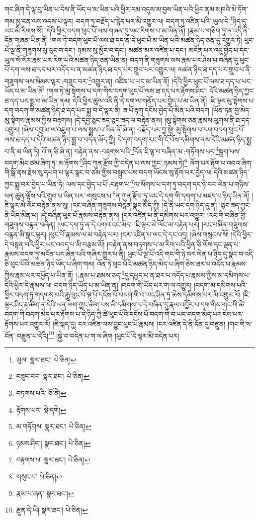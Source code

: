 གང་ཞིག་དེ་ལྟ་བུ་ཡིན་པ་དེས་ནི་ཡོད་པ་མ་ཡིན་པའི་ཕྱིར་རམ་འདུས་མ་བྱས་ཡིན་པའི་ཕྱིར་ནམ་མཁའི་མེ་ཏོག་གམ་མྱ་ངན་ལས་འདས་པ་ལྟར། བདག་ཏུ་བརྗོད་པ་རྙེད་པར་མི་འགྱུར་ལ། བདག་ཏུ་འཛིན་པའི་:ཡུལ་དེ་\footnote{ཡུལ་  སྣར་ཐང་།  པེ་ཅིན། }ཉིད་དུ་ཡང་མི་རིགས་སོ། །དེའི་ཕྱིར་བདག་ཕུང་པོ་ལས་གཞན་དུ་ཡང་རིགས་པ་མ་ཡིན་ནོ། །རྣམ་པ་གཅིག་ཏུ་ན་འདི་ནི་དོན་གཞན་ཡིན་ནོ། །གལ་ཏེ་བདག་ཕུང་པོ་ལས་ཐ་དད་ན་དེ་ཕུང་པོ་མ་ཡིན་པའི་མཚན་ཉིད་ཅན་དུ་འགྱུར་ཏེ། ཕུང་པོ་ལྔ་ནི་གཟུགས་སུ་རུང་བ་དང་། ཉམས་སུ་མྱོང་བ་དང་། མཚན་མར་འཛིན་པ་དང་། མངོན་པར་འདུ་བྱེད་པ་དང་ཡུལ་སོ་སོར་རྣམ་པར་རིག་པའི་མཚན་ཉིད་ཅན་ཡིན་ན། བདག་ནི་གཟུགས་ལས་རྣམ་པར་ཤེས་པ་བཞིན་དུ་ཕུང་པོ་དག་ལས་ཐ་དད་པར་འདོད་པ་ན་མཚན་ཉིད་ཐ་དད་པར་གྲུབ་པར་འགྱུར་ལ། མཚན་ཉིད་ཐ་དད་པར་གྲུབ་པ་ནི་གཟུགས་ལས་སེམས་ལྟར་:གཟུང་བར་\footnote{བཟུང་བར་  སྣར་ཐང་།  པེ་ཅིན། }འགྱུར་ན། འཛིན་པ་ཡང་མ་ཡིན་ནོ། །དེའི་ཕྱིར་ཕུང་པོ་ལས་ཐ་དད་པ་ཡང་ཡོད་པ་མ་ཡིན་ནོ། །གལ་ཏེ་མུ་སྟེགས་པ་དག་གིས་བདག་ཕུང་པོ་ལས་ཐ་དད་པར་རྟོགས་ཤིང་། དེའི་མཚན་ཉིད་ཀྱང་ཐ་དད་པར་སྨྲ་བ་མ་ཡིན་ནམ། དེའི་ཕྱིར་ཚུལ་འདི་ནི་དེ་དག་ལ་གནོད་པར་བྱེད་པ་མ་ཡིན་ནོ། །ཇི་ལྟར་མུ་སྟེགས་པ་དག་བདག་གི་མཚན་ཉིད་ཐ་དད་པར་སྨྲ་བ་དེ་ལྟར་ནི། ཟ་པོ་རྟག་དངོས་བྱེད་པོ་མིན་པའི་བདག །ཡོན་ཏན་བྱ་མེད་མུ་སྟེགས་རྣམས་ཀྱིས་བརྟགས། །དེ་དབྱེ་ཅུང་ཟད་ཅུང་ཟད་ལ་བརྟེན་ནས། །མུ་སྟེགས་ཅན་རྣམས་ལུགས་ནི་ཐ་དད་འགྱུར། །ཞེས་དབུ་མ་ལ་འཇུག་པ་ལས་སྨྲས་པ་ཡིན་ནོ་ཞེ་ན། བརྗོད་པར་བྱ་སྟེ། མུ་སྟེགས་པ་དག་བདག་ཕུང་པོ་ལས་ཐ་དད་པ་དེའི་མཚན་ཉིད་སྨྲ་བ་བདེན་མོད་ཀྱི། དེ་དག་བདག་རང་གི་ངོ་བོས་དམིགས་ནས་དེའི་མཚན་ཉིད་སྨྲ་བ་ནི་མ་ཡིན་ཏེ། འོ་ན་ཅི་ཞེ་ན། བརྟེན་ནས་:བརྟགས་པའི་\footnote{བཏགས་པའི་  ཅོ་ནེ། }དོན་ཇི་ལྟ་བ་བཞིན་མ་:གཏོགས་པར་\footnote{རྟོགས་པར་  སྡེ་དགེ། }སྐྲག་པས་བདག་མིང་ཙམ་ཞིག་ཏུ་:མ་རྟོགས་\footnote{མ་གཏོགས་  སྣར་ཐང་།  པེ་ཅིན། }ཤིང་ཀུན་རྫོབ་ཀྱི་བདེན་པ་ལས་ཀྱང་:ཉམས་ཏེ།\footnote{ཉམས་ཤིང་།  སྣར་ཐང་།  པེ་ཅིན། } ལོག་པར་རྟོག་པ་འབའ་ཞིག་གི་སྒོ་ནས་རྗེས་སུ་དཔག་པ་ལྟར་སྣང་བ་ཙམ་གྱིས་བསླུས་པས་བདག་ཡོངས་སུ་རྟོག་པར་བྱེད་ལ། དེའི་མཚན་ཉིད་ཀྱང་སྨྲ་བར་བྱེད་པ་ཡིན་ཏེ། ལས་དང་བྱེད་པ་པོ་:བརྟག་པ་\footnote{བརྟགས་པ་  སྣར་ཐང་།  པེ་ཅིན། }ལ་སོགས་པ་དག་ཏུ་བདག་དང་ཉེ་བར་ལེན་པ་གཉིས་ཕན་ཚུན་ལྟོས་པའི་གྲུབ་པ་ཡིན་པར་:གསུངས་པ་\footnote{གསུང་བ་  པེ་ཅིན། }ན་ཀུན་རྫོབ་ཏུ་ཡང་དེ་དག་གི་དགག་པ་མཛད་པ་ཉིད་ཡིན་ནོ། །ཇི་ལྟར་མེ་ལོང་བརྟེན་ནས་སུ། །རང་བཞིན་གཟུགས་བརྙན་སྣང་མོད་ཀྱི། །དེ་ནི་ཡང་དག་ཉིད་དུ་ན། །ཅུང་ཟད་ཀྱང་ནི་ཡོད་མིན་པ། །དེ་བཞིན་ཕུང་པོ་རྣམས་བརྟེན་ནས། །ངར་འཛིན་པ་ནི་དམིགས་པར་འགྱུར། །རང་གི་བཞིན་གྱི་གཟུགས་བརྙན་བཞིན། །ཡང་དག་ཏུ་ན་དེ་འགའ་འང་མེད། །ཇི་ལྟར་མེ་ལོང་མ་བརྟེན་པར། །རང་བཞིན་གཟུགས་བརྙན་མི་སྣང་ལྟར། །ཕུང་པོ་རྣམས་ལ་མ་བརྟེན་པར། །ངར་འཛིན་པ་ལང་དེ་དང་འདྲ། །ཞེས་གསུངས་སོ། །དེའི་ཕྱིར་དེ་བསྟན་པའི་ཕྱིར་ཡང་འབད་པ་མི་བརྩམ་མོ། །བརྟེན་ནས་བཏགས་པ་མ་རིག་པའི་ཕྱིན་ཅི་ལོག་དང་ལྡན་པ་རྣམས་བདག་ཏུ་མངོན་པར་ཞེན་པའི་གཞིར་གྱུར་པ་ནི། ཕུང་པོ་ལྔ་པོ་འདི་གང་གི་ཉེ་བར་ལེན་པ་ཉིད་དུ་སྣང་བ་འདི་ཅི་ཕུང་པོའི་མཚན་ཉིད་ཡོད་པ་ཞིག་གམ། འོན་ཏེ་ཕུང་པོའི་མཚན་ཉིད་མེད་པ་ཞིག་ཅེས་ཐར་པ་འདོད་པ་རྣམས་ཀྱིས་རྣམ་པར་དཔྱོད་པ་ཡིན་ནོ། །:རྣམ་པ་ཐམས་ཅད་\footnote{རྣམ་པ་ཞན་  སྣར་ཐང་། }དུ་དཔྱད་པ་ན་ཐར་པ་འདོད་པ་རྣམས་ཀྱིས་མ་དམིགས་པ་དེའི་ཕྱིར་དེ་རྣམས་ལ། བདག་ཉིད་ཡོད་པ་མ་ཡིན་ན། །བདག་གི་ཡོད་པར་ག་ལ་འགྱུར། །བདག་མ་དམིགས་པའི་ཕྱིར་བདག་ཏུ་གདགས་པའི་རྒྱུ་ཕུང་པོ་ལྔ་པོ་དངོས་པོ་བདག་གི་བ་ཡང་ཤིན་ཏུ་ཆེས་དམིགས་པར་མི་འགྱུར་རོ། །ཇི་ལྟར་ཤིང་རྟ་ཚིག་ན་དེའི་ཡན་ལག་ཀྱང་ཚིག་པས་མི་དམིགས་པ་དེ་བཞིན་དུ་རྣལ་འབྱོར་པ་དག་གིས་གང་གི་ཚེ་བདག་གི་བདག་མེད་པར་རྟོགས་པ་དེ་ཉིད་ཀྱི་ཚེ་ཕུང་པོའི་དངོས་པོ་བདག་གི་བ་ཡང་བདག་མེད་པར་ངེས་པར་རྟོགས་པར་འགྱུར་རོ། །ཇི་སྐད་དུ། ངར་འཛིན་ལས་བྱུང་ཕུང་པོ་རྣམས། །ངར་འཛིན་དེ་ནི་དོན་དུ་བརྫུན། །གང་གི་ས་བོན་:བརྫུན་པ་དེའི།\footnote{རྫུན་དེ་ཡི།  སྣར་ཐང་།  པེ་ཅིན། } །སྐྱེ་བ་བདེན་པ་ག་ལ་ཞིག །ཕུང་པོ་དེ་ལྟར་མི་བདེན་པར། 